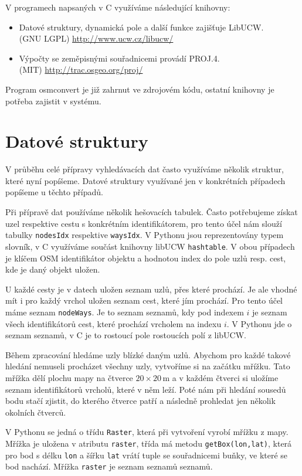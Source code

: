 \noindent V programech napsaných v C využíváme následující knihovny:
\begin{itemize}
	\item Datové struktury, dynamická pole a další funkce zajišťuje
	{\tuc LibUCW}.\\
	(GNU LGPL) \url{http://www.ucw.cz/libucw/}
	\item Výpočty se zeměpisnými souřadnicemi provádí {\tuc PROJ.4}.\\
	(MIT) \url{http://trac.osgeo.org/proj/}
\end{itemize}

Program osmconvert je již zahrnut ve zdrojovém kódu, ostatní knihovny je potřeba
zajistit v systému.

\section{Datové struktury}
V průběhu celé přípravy vyhledávacích dat často využíváme několik struktur,
které nyní popíšeme. Datové struktury využívané jen v konkrétních případech
popíšeme u těchto případů.

Při přípravě dat používáme několik {\tuc hešovacích tabulek}. Často potřebujeme
získat uzel respektive cestu s konkrétním identifikátorem, pro tento účel nám
slouží tabulky \verb|nodesIdx| respektive \verb|waysIdx|. V Pythonu jsou
reprezentovány typem slovník, v C využíváme součást knihovny libUCW
\verb|hashtable|. V obou případech je klíčem OSM identifikátor objektu a
hodnotou index do pole uzlů resp. cest, kde je daný objekt uložen.

U každé cesty je v datech uložen seznam uzlů, přes které prochází. Je ale vhodné
mít i pro každý vrchol uložen seznam cest, které jím prochází. Pro tento účel
máme seznam \verb|nodeWays|. Je to seznam seznamů, kdy pod indexem $i$ je seznam
všech identifikátorů cest, které prochází vrcholem na indexu $i$. V Pythonu jde
o seznam seznamů, v C je to rostoucí pole rostoucích polí z libUCW.

Během zpracování hledáme uzly blízké daným uzlů. Abychom pro každé takové
hledání nemuseli procházet všechny uzly, vytvoříme si na začátku {\tuc mřížku}.
Tato mřížka dělí plochu mapy na čtverce $20 \times 20$\,m a v každém čtverci si
uložíme seznam identifikátorů vrcholů, které v něm leží. Poté nám při hledání
sousedů bodu stačí zjistit, do kterého čtverce patří a následně prohledat jen
několik okolních čtverců.

V Pythonu se jedná o třídu \verb|Raster|, která při vytvoření vyrobí mřížku z
mapy. Mřížka je uložena v atributu \verb|raster|, třída má metodu
\verb|getBox(lon,lat)|, která pro bod s  délku \verb|lon| a šířku \verb|lat|
vrátí tuple se souřadnicemi buňky, ve které se bod nachází. Mřížka \verb|raster|
je seznam seznamů seznamů.

